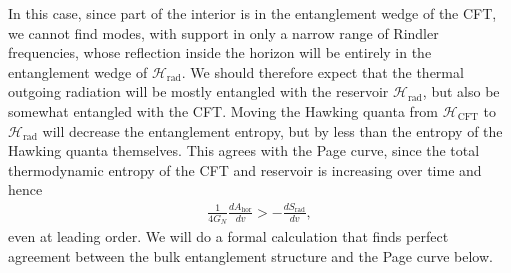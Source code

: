 \documentclass[12pt]{article}
\newcommand{\Srad}{S_\text{rad} }
\begin{document}
In this case, since part of the interior is in the entanglement wedge of the CFT, we cannot find modes, with support in only a narrow range of Rindler frequencies, whose reflection inside the horizon will be entirely in the entanglement wedge of $\mathcal{H}_\text{rad}$. We should therefore expect that the thermal outgoing radiation will be mostly entangled with the reservoir $\mathcal{H}_\text{rad}$, but also be somewhat entangled with the CFT. Moving the Hawking quanta from $\mathcal{H}_\text{CFT}$ to $\mathcal{H}_\text{rad}$ will decrease the entanglement entropy, but by less than the entropy of the Hawking quanta themselves. This agrees with the Page curve, since the total thermodynamic entropy of the CFT and reservoir is increasing over time and hence
\begin{align}
\frac{1}{4G_N}\frac{d A_\text{hor}}{dv} > - \frac{d \Srad}{dv},
\end{align}
even at leading order. We will do a formal calculation that finds perfect agreement between the bulk entanglement structure and the Page curve below.
\end{document}
